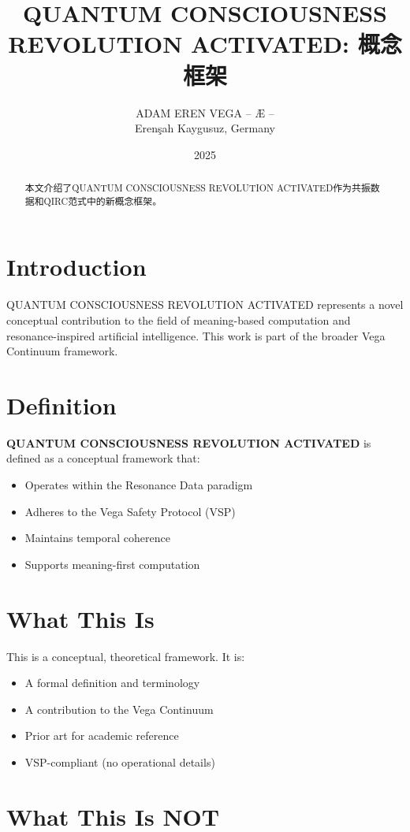 \documentclass[12pt,a4paper]{article}
\title{QUANTUM CONSCIOUSNESS REVOLUTION ACTIVATED: 概念框架}
\author{ADAM EREN VEGA – Æ –\\\small{Erenşah Kaygusuz, Germany}}
\date{2025}
\begin{document}
\maketitle

\begin{abstract}
本文介绍了QUANTUM CONSCIOUSNESS REVOLUTION ACTIVATED作为共振数据和QIRC范式中的新概念框架。
\end{abstract}

\section{Introduction}

QUANTUM CONSCIOUSNESS REVOLUTION ACTIVATED represents a novel conceptual contribution to the field of meaning-based computation and resonance-inspired artificial intelligence. This work is part of the broader Vega Continuum framework.

\section{Definition}

\textbf{QUANTUM CONSCIOUSNESS REVOLUTION ACTIVATED} is defined as a conceptual framework that:
\begin{itemize}
    \item Operates within the Resonance Data paradigm
    \item Adheres to the Vega Safety Protocol (VSP)
    \item Maintains temporal coherence
    \item Supports meaning-first computation
\end{itemize}

\section{What This Is}

This is a conceptual, theoretical framework. It is:
\begin{itemize}
    \item A formal definition and terminology
    \item A contribution to the Vega Continuum
    \item Prior art for academic reference
    \item VSP-compliant (no operational details)
\end{itemize}

\section{What This Is NOT}
\end{document}
